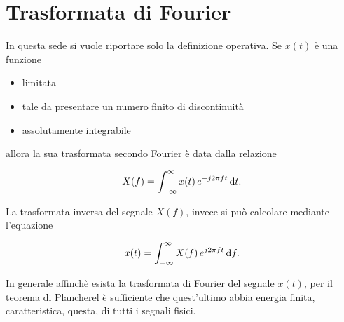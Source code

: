 
\section{Trasformata di Fourier}
\label{sec:fourier}

In questa sede si vuole riportare solo la definizione operativa.
Se $x(t)$ \`e una funzione 

\begin{itemize}   
   \item limitata
   \item tale da presentare un numero finito di discontinuit\`a 
   \item assolutamente integrabile  
\end{itemize}

allora la sua trasformata secondo Fourier \`e data dalla relazione 

\begin{equation}
 \label{eq:fourier}
  X(f) = \int_{-\infty}^{\infty} x(t) \, e^{-j2\pi ft} \, \mathrm{d} t.\\
\end{equation}

La trasformata inversa del segnale $X(f)$, invece si pu\`o calcolare mediante l'equazione

\begin{equation}
  \label{eq:invfourier}
  x(t) = \int_{-\infty}^{\infty} X(f) \, e^{j2\pi ft} \, \mathrm{d} f.\\
\end{equation}

In generale affinch\`e esista la trasformata di Fourier del segnale $x(t)$, per il teorema di Plancherel \`e sufficiente 
che quest'ultimo abbia energia finita, caratteristica, questa, di tutti i segnali fisici.\\

